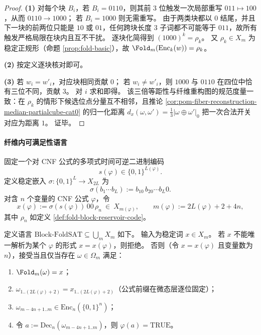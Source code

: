 \begin{proof}
\textbf{(1)}
对每个块 \(B_i\)，若 \(B_i=0110\)，则其前 \(3\) 位触发一次局部重写 \(011\mapsto 100\)，从而 \(0110\to 1000\)；
若 \(B_i=1000\) 则无需重写。
由于两类块都以 \(0\) 结尾，并且下一块的前两位只能是 \(10\) 或 \(01\)，任何跨块长度 \(3\) 子词都不可能等于 \(011\)，故所有触发严格局限在块内且互不干扰。
逐块化简得到 \((1000)^k=\rho_k\)。
又 \(\rho_k\in X_m\) 为稳定正规形（命题 \ref{prop:fold-basic}），故 \(\Fold_m(\mathrm{Enc}_k(w))=\rho_k\)。
\par
\textbf{(2)}
按定义逐块核对即可。
\par
\textbf{(3)}
若 \(w_i=w'_i\)，对应块相同贡献 \(0\)；
若 \(w_i\neq w'_i\)，则 \(1000\) 与 \(0110\) 在四位中恰有三位不同，贡献 \(3\)。
对 \(i\) 求和即得。
该三倍等距性与纤维重构图的规范度量一致：在 \(\rho_k\) 的情形下候选位点分量互不相邻，且推论 \ref{cor:pom-fiber-reconstruction-median-partialcube-cat0} 的归一化距离 \(d_x(\omega,\omega')=\frac13|\omega\oplus\omega'|_0\) 把一次合法开关对应为距离 \(1\)。
证毕。
\end{proof}

\paragraph{纤维内可满足性语言}
固定一个对 CNF 公式的多项式时间可逆二进制编码
\[
s(\varphi)\in\{0,1\}^{L(\varphi)}.
\]
定义稳定嵌入 \(\sigma:\{0,1\}^{L}\to X_{2L}\) 为
\[
\sigma(b_1\cdots b_L):=b_10\,b_20\cdots b_L0.
\]
对含 \(n\) 个变量的 CNF 公式 \(\varphi\)，令
\[
x(\varphi):=\sigma(s(\varphi))\,00\,\rho_n\ \in\ X_{m(\varphi)},
\qquad
m(\varphi):=2L(\varphi)+2+4n,
\]
其中 \(\rho_n\) 如定义 \ref{def:fold-block-reservoir-code}。

\begin{definition}\label{def:block-foldsat-language}
定义语言 \(\mathrm{Block}\text{-}\mathrm{FoldSAT}\subseteq\bigcup_m X_m\) 如下。
输入为稳定词 \(x\in X_m\)。
若 \(x\) 不能唯一解析为某个 \(\varphi\) 的形式 \(x=x(\varphi)\)，则拒绝。
否则（令 \(x=x(\varphi)\) 且变量数为 \(n\)），接受当且仅当存在 \(\omega\in\Omega_m\) 满足：
\begin{enumerate}
  \item \(\Fold_m(\omega)=x\)；
  \item \(\omega_{1..(2L(\varphi)+2)}=x_{1..(2L(\varphi)+2)}\)（公式前缀在微态层逐位固定）；
  \item \(\omega_{m-4n+1..m}\in \mathrm{Enc}_n(\{0,1\}^n)\)；
  \item 令 \(a:=\mathrm{Dec}_n(\omega_{m-4n+1..m})\)，则 \(\varphi(a)=\mathrm{TRUE}\)。
\end{enumerate}
\end{definition}

